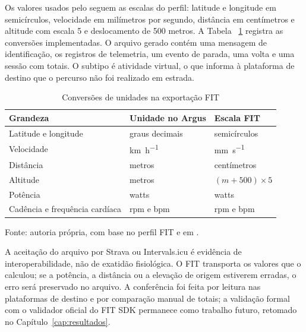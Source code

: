 Os valores usados pelo \argus{} seguem as escalas do perfil: latitude e
longitude em semicírculos, velocidade em milímetros por segundo, distância em
centímetros e altitude com escala 5 e deslocamento de 500 metros. A Tabela~
\ref{tab:fit-escalas} registra as conversões implementadas. O arquivo gerado
contém uma mensagem de identificação, os registros de telemetria, um evento de
parada, uma volta e uma sessão com totais. O subtipo é atividade virtual, o que
informa à plataforma de destino que o percurso não foi realizado em estrada.

\begin{table}[htbp]
    \centering
    \caption{Conversões de unidades na exportação FIT}
    \label{tab:fit-escalas}
    \small
    \begin{tabular}{@{}>{\raggedright\arraybackslash}p{4.2cm}
        >{\raggedright\arraybackslash}p{5.2cm}
        >{\raggedright\arraybackslash}p{4.0cm}@{}}
        \toprule
        \textbf{Grandeza} & \textbf{Unidade no Argus} & \textbf{Escala FIT} \\
        \midrule
        Latitude e longitude & graus decimais & semicírculos \\
        Velocidade & \si{\kilo\meter\per\hour} & \si{\milli\meter\per\second} \\
        Distância & metros & centímetros \\
        Altitude & metros & $(m + 500) \times 5$ \\
        Potência & watts & watts \\
        Cadência e frequência cardíaca & rpm e bpm & rpm e bpm \\
        \bottomrule
    \end{tabular}
    \vspace{0.2cm}
    \par\small Fonte: autoria própria, com base no perfil FIT
    \cite{garmin2024} e em .
\end{table}

A aceitação do arquivo por Strava ou Intervals.icu é evidência de
interoperabilidade, não de exatidão fisiológica. O FIT transporta os valores
que o \argus{} calculou; se a potência, a distância ou a elevação de origem
estiverem erradas, o erro será preservado no arquivo. A conferência foi feita por
leitura nas plataformas de destino e por comparação manual de totais; a validação
formal com o validador oficial do FIT SDK permanece como trabalho futuro,
retomado no Capítulo~\ref{cap:resultados}.


